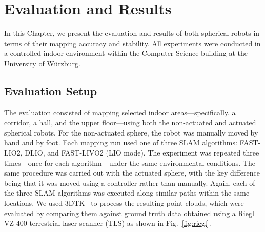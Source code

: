 \documentclass[english, bachelor, utf8]{base/thesis_telematics}
\begin{document}
\chapter{Evaluation and Results}
\label{ch:evaluation}

In this Chapter, we present the evaluation and results of both spherical robots in terms of their mapping accuracy and stability.
All experiments were conducted in a controlled indoor environment within the Computer Science building at the University of Würzburg.

\section{Evaluation Setup}
The evaluation consisted of mapping selected indoor areas—specifically, a corridor, a hall, and the upper floor—using both the non-actuated and actuated spherical robots. 
For the non-actuated sphere, the robot was manually moved by hand and by foot. 
Each mapping run used one of three SLAM algorithms: FAST-LIO2, DLIO, and FAST-LIVO2 (LIO mode). 
The experiment was repeated three times—once for each algorithm—under the same environmental conditions. 
The same procedure was carried out with the actuated sphere, with the key difference being that it was moved using a controller rather than manually. 
Again, each of the three SLAM algorithms was executed along similar paths within the same locations. 
We used 3DTK~\cite{3dtk} to process the resulting point-clouds, which were evaluated by comparing them against ground truth data obtained using a Riegl VZ-400 terrestrial laser scanner (TLS) as shown in Fig.~\ref{fig:riegl}.
\end{document}
